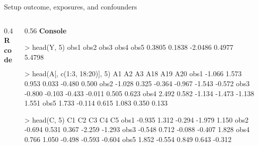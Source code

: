 \documentclass[
  ignorenonframetext,
  aspectratio=169,
  11pt]{beamer}
\newenvironment{Shaded}{\begin{snugshade}}{\end{snugshade}}
\newcommand{\DecValTok}[1]{\textcolor[rgb]{0.68,0.00,0.00}{#1}}
\newcommand{\FunctionTok}[1]{\textcolor[rgb]{0.28,0.35,0.67}{#1}}
\newcommand{\NormalTok}[1]{\textcolor[rgb]{0.00,0.23,0.31}{#1}}
\newcommand{\OtherTok}[1]{\textcolor[rgb]{0.00,0.23,0.31}{#1}}
\newcommand{\SpecialCharTok}[1]{\textcolor[rgb]{0.37,0.37,0.37}{#1}}
\newcommand{\workflowcodefont}{\fontsize{6.3}{7.1}\selectfont}
\newcommand{\method}[1]{%
  \textcolor{emoryblue}{\textbf{#1}}%
}
\begin{document}
\begin{frame}[fragile,t]{Setup outcome, exposures, and confounders}
\protect{}\label{setup-outcome-exposures-and-confounders}
\begin{columns}[T]
\begin{column}{0.4\linewidth}
\method{R code}

\workflowcodefont

\begin{Shaded}
\end{Shaded}
\end{column}

\begin{column}{0.56\linewidth}
\method{Console}

\workflowcodefont

\begin{Shaded}
\begin{Highlighting}[]
\NormalTok{\textgreater{} head(Y, 5)}
\NormalTok{     obs1      obs2      obs3      obs4      obs5}
\NormalTok{  0.3805    0.1838   {-}2.0486    0.4977    5.4798}

\NormalTok{\textgreater{} head(A[, c(1:3, 18:20)], 5)}
\NormalTok{         A1     A2     A3    A18    A19    A20}
\NormalTok{obs1 {-}1.066  1.573  0.953  0.033 {-}0.480  0.500}
\NormalTok{obs2 {-}1.028  0.325 {-}0.364 {-}0.967 {-}1.543 {-}0.572}
\NormalTok{obs3 {-}0.800 {-}0.103 {-}0.433 {-}0.011  0.505  0.623}
\NormalTok{obs4  2.492  0.582 {-}1.134 {-}1.473 {-}1.138  1.551}
\NormalTok{obs5  1.733 {-}0.114  0.615  1.083  0.350  0.133}

\NormalTok{\textgreater{} head(C, 5)}
\NormalTok{         C1    C2     C3     C4     C5}
\NormalTok{obs1 {-}0.935 1.312 {-}0.294 {-}1.979  1.150}
\NormalTok{obs2 {-}0.694 0.531  0.367 {-}2.259 {-}1.293}
\NormalTok{obs3 {-}0.548 0.712 {-}0.088 {-}0.407  1.828}
\NormalTok{obs4  0.766 1.050 {-}0.498 {-}0.593 {-}0.604}
\NormalTok{obs5  1.852 {-}0.554  0.849  0.643 {-}0.312}
\end{Highlighting}
\end{Shaded}
\end{column}
\end{columns}
\end{frame}
\end{document}

